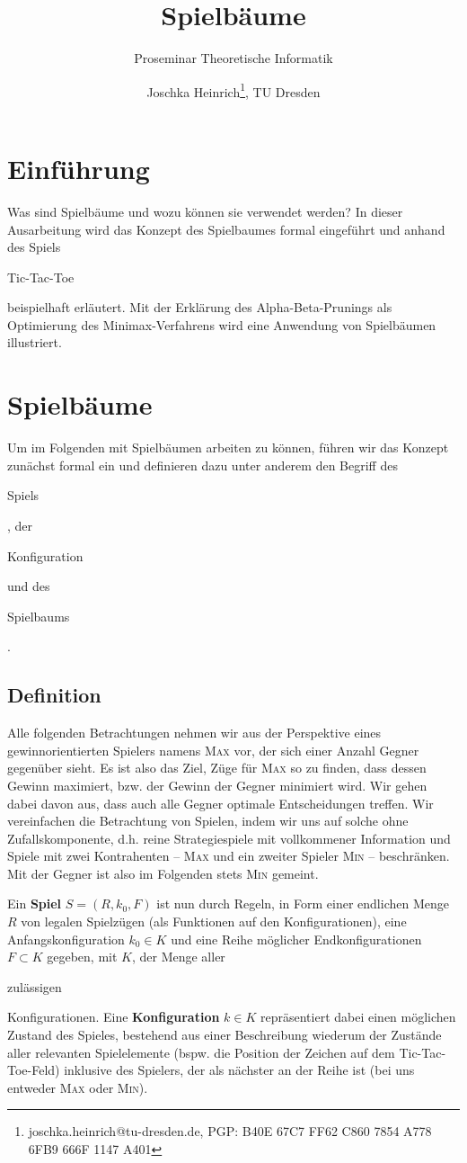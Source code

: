 \documentclass[a4paper]{scrartcl}
\title{Spielbäume}
\subtitle{Proseminar Theoretische Informatik}
\author{Joschka Heinrich\thanks{joschka.heinrich@tu-dresden.de, PGP: \textsc{B40E 67C7 FF62 C860 7854 A778 6FB9 666F 1147 A401}}, TU Dresden}
\newcommand\e[1]{\begin{em}#1\end{em}}
\newcommand\q[1]{\glqq #1\grqq}
\begin{document}
\maketitle



\section{Einführung}
Was sind Spielbäume und wozu können sie verwendet werden? In dieser Ausarbeitung wird das Konzept des Spielbaumes formal eingeführt und anhand des Spiels \e{Tic-Tac-Toe} beispielhaft erläutert. Mit der Erklärung des Alpha-Beta-Prunings als Optimierung des Minimax-Verfahrens wird eine Anwendung von Spielbäumen illustriert.


\section{Spielbäume}
Um im Folgenden mit Spielbäumen arbeiten zu können, führen wir das Konzept zunächst formal ein und definieren dazu unter anderem den Begriff des \e{Spiels}, der \e{Konfiguration} und des \e{Spielbaums}.


\subsection{Definition}

Alle folgenden Betrachtungen nehmen wir aus der Perspektive eines gewinnorientierten Spielers namens \textsc{Max} vor, der sich einer Anzahl Gegner gegenüber sieht. Es ist also das Ziel, Züge für \textsc{Max} so zu finden, dass dessen Gewinn maximiert, bzw. der Gewinn der Gegner minimiert wird. Wir gehen dabei davon aus, dass auch alle Gegner optimale Entscheidungen treffen. Wir vereinfachen die Betrachtung von Spielen, indem wir uns auf solche ohne Zufallskomponente, d.h. reine Strategiespiele mit vollkommener Information und Spiele mit zwei Kontrahenten -- \textsc{Max} und ein zweiter Spieler \textsc{Min} -- beschränken. Mit \q{der Gegner} ist also im Folgenden stets \textsc{Min} gemeint. 

Ein \textbf{Spiel} $S = (R,k_0,F)$ ist nun durch Regeln, in Form einer endlichen Menge $R$ von legalen Spielzügen (als Funktionen auf den Konfigurationen), eine Anfangskonfiguration $k_0 \in K$ und eine Reihe möglicher Endkonfigurationen $F \subset K$ gegeben, mit $K$, der Menge aller \e{zulässigen} Konfigurationen. Eine \textbf{Konfiguration} $k \in K$ repräsentiert dabei einen möglichen Zustand des Spieles, bestehend aus einer Beschreibung wiederum der Zustände aller relevanten Spielelemente (bspw. die Position der Zeichen auf dem Tic-Tac-Toe-Feld) inklusive des Spielers, der als nächster an der Reihe ist (bei uns entweder \textsc{Max} oder \textsc{Min}).
\end{document}

